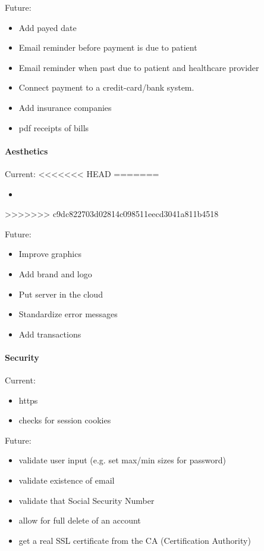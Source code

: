 \documentclass[12pt]{report}
\begin{document}
Future:
\begin{itemize}
\item Add payed date
\item Email reminder before payment is due to patient
\item Email reminder when past due to patient and healthcare provider
\item Connect payment to a credit-card/bank system.
\item Add insurance companies
\item pdf receipts of bills
\end{itemize}

\paragraph{Aesthetics}
Current:
<<<<<<< HEAD
=======
\begin{itemize}
\item 
\end{itemize}
>>>>>>> c9dc822703d02814c098511eecd3041a811b4518

Future: 
\begin{itemize}
\item Improve graphics
\item Add brand and logo
\item Put server in the cloud
\item Standardize error messages
\item Add transactions
\end{itemize}

\paragraph{Security}
Current:
\begin{itemize}
\item https
\item checks for session cookies
\end{itemize}
Future: 
\begin{itemize}
\item validate user input (e.g. set max/min sizes for password)
\item validate existence of email
\item validate that Social Security Number
\item allow for full delete of an account
\item get a real SSL certificate from the CA (Certification Authority)
\end{itemize}
\end{document}
